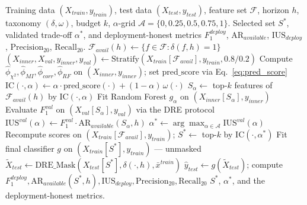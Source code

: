 \documentclass[a4paper,fleqn]{cas-sc}
\begin{document}
\begin{algorithm}[t]
\caption{Intervention-Constrained Feature Selection (IC-FS).}
\label{alg:icfs}
\begin{algorithmic}[1]
\Require Training data $(X_{train}, y_{train})$, test data
         $(X_{test}, y_{test})$, feature set $\mathcal{F}$, horizon
         $h$, taxonomy $(\delta, \omega)$, budget $k$,
         $\alpha$-grid $\mathcal{A} = \{0, 0.25, 0.5, 0.75, 1\}$.
\Ensure  Selected set $S^*$, validated trade-off $\alpha^*$, and
         deployment-honest metrics $F_1^{deploy}$,
         $\mathrm{AR}_{available}$, $\mathrm{IUS}_{deploy}$,
         $\mathrm{Precision}_{20}$, $\mathrm{Recall}_{20}$.
\Statex
\State $\mathcal{F}_{avail}(h) \gets
        \{f \in \mathcal{F} : \delta(f, h) = 1\}$
\State $(X_{inner}, X_{val}, y_{inner}, y_{val}) \gets
        \mathrm{Stratify}(X_{train}[\mathcal{F}_{avail}], y_{train},
        0.8/0.2)$ 
\State Compute $\hat\phi_{\chi^2}, \hat\phi_{MI}, \hat\phi_{corr},
        \hat\phi_{RF}$ on $(X_{inner}, y_{inner})$;
        set $\mathrm{pred\_score}$ via Eq.~\eqref{eq:pred_score}
\Statex
{}    
    \State $\mathrm{IC}(\cdot, \alpha) \gets
            \alpha \cdot \mathrm{pred\_score}(\cdot)
            + (1 - \alpha)\,\omega(\cdot)$
    \State $S_\alpha \gets$ top-$k$ features of
            $\mathcal{F}_{avail}(h)$ by $\mathrm{IC}(\cdot, \alpha)$
    \State Fit Random Forest $g_\alpha$ on
            $(X_{inner}[S_\alpha], y_{inner})$
    \State Evaluate $F_1^{val}$ on $(X_{val}[S_\alpha], y_{val})$
            via the DRE protocol
    \State $\mathrm{IUS}^{val}(\alpha) \gets
            F_1^{val} \cdot \mathrm{AR}_{available}(S_\alpha, h)$
\EndFor
\State $\alpha^* \gets \arg\max_{\alpha \in \mathcal{A}}
         \mathrm{IUS}^{val}(\alpha)$
\Statex
\State Recompute scores on $(X_{train}[\mathcal{F}_{avail}], y_{train})$;
       $S^* \gets$ top-$k$ by $\mathrm{IC}(\cdot, \alpha^*)$
\State Fit final classifier $g$ on $(X_{train}[S^*], y_{train})$ ---
       unmasked
\Statex
\State $\widetilde{X}_{test} \gets \mathrm{DRE\_Mask}(X_{test}[S^*],
       \delta(\cdot, h), \bar{x}^{train})$
\State $\hat{y}_{test} \gets g(\widetilde{X}_{test})$;
       compute $F_1^{deploy}, \mathrm{AR}_{available}(S^*, h),
       \mathrm{IUS}_{deploy}, \mathrm{Precision}_{20},
       \mathrm{Recall}_{20}$
\State \Return $S^*$, $\alpha^*$, and the deployment-honest metrics.
\end{algorithmic}
\end{algorithm}
\end{document}
